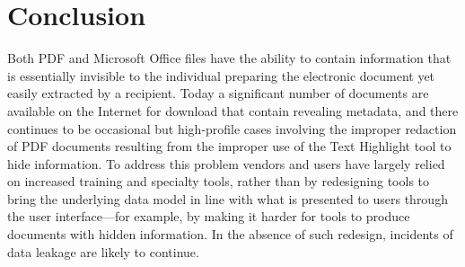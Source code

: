 \section{Conclusion}

Both PDF and Microsoft Office
files have the ability to contain information that is  essentially invisible to the individual preparing the
electronic document yet easily extracted by a recipient. Today a significant number of documents are available on the Internet
for download that contain revealing metadata, and there continues to
be occasional but high-profile cases involving the improper redaction
of PDF documents resulting from the improper use of the Text Highlight
tool to hide information. To address this problem vendors and users
have largely relied on increased training and specialty tools, rather
than by redesigning tools to bring the underlying data model in line
with what is presented to users through the user interface---for
example, by making it harder for tools to produce documents with
hidden information. In the absence of such redesign, incidents of data
leakage are likely to continue.


% 


